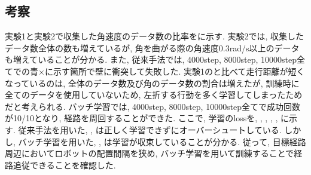 \subsection{考察}
実験1と実験2で収集した角速度のデータ数の比率をに示す. 実験2では, 収集したデータ数全体の数も増えているが, 角を曲がる際の角速度0.3rad/s以上のデータも増えていることが分かる. また, 従来手法では, 4000step, 8000step, 10000step全てでの青×に示す箇所で壁に衝突して失敗した. 実験1のと比べて走行距離が短くなっているのは, 全体のデータ数及び角のデータ数の割合は増えたが, 訓練時に全てのデータを使用していないため, 左折する行動を多く学習してしまったためだと考えられる. バッチ学習では, 4000step, 8000step, 10000step全てで成功回数が10/10となり, 経路を周回することができた. ここで, 学習のlossを, , , , , に示す. 従来手法を用いた, , は正しく学習できずにオーバーシュートしている. しかし, バッチ学習を用いた, , は学習が収束していることが分かる. 従って, 目標経路周辺においてロボットの配置間隔を狭め, バッチ学習を用いて訓練することで経路追従できることを確認した. 

